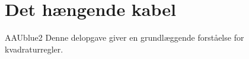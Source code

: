 \chapter{Det hængende kabel}
\begin{color}{AAUblue2}
%
Denne delopgave giver en grundlæggende forståelse for kvadraturregler.
% 
\end{color}



